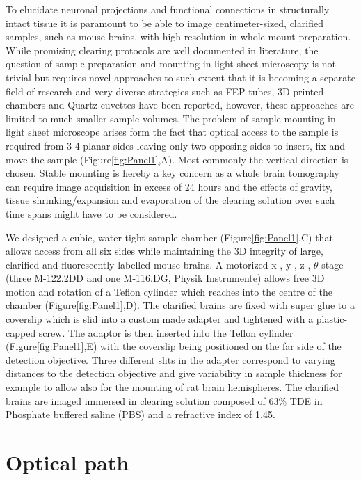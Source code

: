 \documentclass[12pt]{spieman}  %
\begin{document}
To elucidate neuronal projections and functional connections in structurally intact tissue it is paramount to be able to image centimeter-sized, clarified samples, such as mouse brains, with high resolution in whole mount preparation. While promising clearing protocols are well documented in literature\cite{Chung2013,Tomer2014}, the question of sample preparation and mounting in light sheet microscopy is not trivial but requires novel approaches to such extent that it is becoming a separate field of research and very diverse strategies such as FEP tubes, 3D printed chambers and Quartz cuvettes have been reported\cite{Kaufmann2012,Pitrone2013,Olarte2012,Tomer2014}, however, these approaches are limited to much smaller sample volumes. The problem of sample mounting in light sheet microscope arises form the fact that optical access to the sample is required from 3-4 planar sides leaving only two opposing sides to insert, fix and move the sample (Figure\ref{fig:Panel1},A). Most commonly the vertical direction is chosen. Stable mounting is hereby a key concern as a whole brain tomography can require image acquisition in excess of 24 hours and the effects of gravity, tissue shrinking/expansion and evaporation of the clearing solution over such time spans might have to be considered.  
	
We designed a cubic, water-tight sample chamber (Figure\ref{fig:Panel1},C) that allows access from all six sides while maintaining the 3D integrity of large, clarified and fluorescently-labelled mouse brains. A motorized x-, y-, z-, $\theta$-stage (three M-122.2DD and one M-116.DG, Physik Instrumente) allows free 3D motion and rotation of a Teflon cylinder which reaches into the centre of the chamber (Figure\ref{fig:Panel1},D). The clarified brains are fixed with super glue to a coverslip which is slid into a custom made adapter and tightened with a plastic-capped screw. The adaptor is then inserted into the Teflon cylinder (Figure\ref{fig:Panel1},E) with the coverslip being positioned on the far side of the detection objective. Three different slits in the adapter correspond to varying distances to the detection objective and give variability in sample thickness for example to allow also for the mounting of rat brain hemispheres. The clarified brains are imaged immersed in clearing solution composed of 63\% TDE in Phosphate buffered saline (PBS) and a refractive index of 1.45. 		
		
	\section{Optical path}
\end{document}

